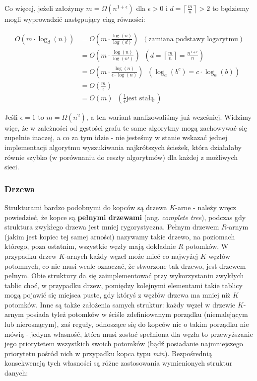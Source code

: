 Co więcej, jeżeli założymy $m = \Omega \left( n^{1+\epsilon} \right)$ dla $\epsilon > 0$ i $d = \left \lceil \frac{m}{n} \right \rceil > 2$ to będziemy mogli wyprowadzić następujący ciąg równości:

\begin{equation}
	\begin{aligned}
		O \left( m \cdot \log_{d} \left( n \right) \right) &= O \left( m \cdot \frac{\log \left( n \right)}{\log \left( d \right)} \right) \; \; \left( \textrm{zamiana podstawy logarytmu} \right) \\
		&= O \left( m \cdot \frac{\log \left( n \right)}{\log \left( n^{\epsilon} \right)} \right) \; \; \left( d = \left \lceil \frac{m}{n} \right \rceil = \frac{n^{1+\epsilon}}{n} \right) \\
		&= O \left( m \cdot \frac{\log \left( n \right)}{ \epsilon \cdot \log \left( n \right)} \right) \; \; \left( \log_{a} \left( b^{c} \right) = c \cdot \log_{a} \left( b \right) \right) \\
		&= O \left( \frac{m}{\epsilon} \right) \\
		&= O \left( m \right) \; \; \left( \frac{1}{\epsilon} \textrm{jest stałą.} \right)
	\end{aligned}
\end{equation}


Jeśli $\epsilon = 1$ to $ m = \Omega \left( n^{2} \right)$, a ten wariant analizowaliśmy już wcześniej. Widzimy więc, że w zależności od gęstości grafu te same algorytmy mogą zachowywać się zupełnie inaczej, a co za tym idzie - nie jesteśmy w stanie wskazać jednej implementacji algorytmu wyszukiwania najkrótszych ścieżek, która działałaby równie szybko (w porównaniu do reszty algorytmów) dla każdej z możliwych sieci.

\subsubsection{Drzewa}

Strukturami bardzo podobnymi do kopców są drzewa $K$-arne - należy wręcz powiedzieć, że kopce są \textbf{pełnymi drzewami} (ang. \textit{complete tree}), podczas gdy struktura zwykłego drzewa jest mniej rygorystyczna. Pełnym drzewem $R$-arnym (jakim jest kopiec tej samej arności) nazywamy takie drzewo, na poziomach którego, poza ostatnim, wszystkie węzły mają dokładnie $R$ potomków. W przypadku drzew $K$-arnych każdy węzeł może mieć co najwyżej $K$ węzłów potomnych, co nie musi wcale oznaczać, że stworzone tak drzewo, jest drzewem pełnym. Obie struktury da się zaimplementować przy wykorzystaniu zwykłych tablic choć, w przypadku drzew, pomiędzy kolejnymi elementami takie tablicy mogą pojawić się miejsca puste, gdy któryś z węzłów drzewa ma mniej niż $K$ potomków. Inne są także założenia samych struktur: każdy węzeł w drzewie $K$-arnym posiada tyleż potomków w ściśle zdefiniowanym porządku (niemalejącym lub nierosnącym), zaś reguły, odnoszące się do kopców nic o takim porządku nie mówią - jedyna własność, która musi zostać spełniona dla węzła to przewyższanie jego priorytetem wszystkich swoich potomków (bądź posiadanie najmniejszego priorytetu pośród nich w przypadku kopca typu \textit{min}). Bezpośrednią konsekwencją tych własności są różne zastosowania wymienionych struktur danych: 

